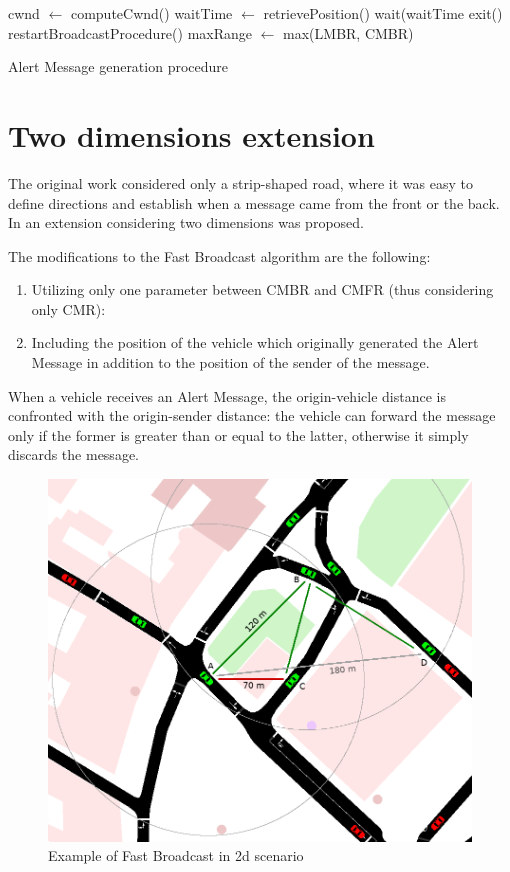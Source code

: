 		\begin{algorithm}[H]
			\begin{algorithmic}[1]
				\State cwnd $\gets$ computeCwnd()
				\State waitTime $\gets$ retrievePosition()
				\State wait(waitTime
				\State exit()
				\State restartBroadcastProcedure()
				\Else 
				\State maxRange $\gets$ max(LMBR, CMBR)
				\EndIf 
			\end{algorithmic}
			\caption{Alert Message generation procedure}
			\label{alg:alert-message-forwarding}
		\end{algorithm}
	
	\section{Two dimensions extension}
		The original work \cite{4199282} considered only a strip-shaped road, where it was easy to define directions and establish 	when a message came from the front or the back. In \cite{BAR2017} an extension considering two dimensions was proposed. 
		
		
		The modifications to the Fast Broadcast algorithm are the following:
		\begin{enumerate}
			\item Utilizing only one parameter between CMBR and CMFR (thus considering only CMR):
			\item Including the position of the vehicle which originally generated the Alert Message in addition to the position of the sender of the message.
		\end{enumerate}
		
		
		When a vehicle receives an Alert Message, the origin-vehicle distance is confronted with the origin-sender distance: the vehicle can forward the message only if the former is greater than or equal to the latter, otherwise it simply discards the message.
		
		\begin{figure}[H]
			\centering
			\includegraphics[width=\textwidth]{immagini/fb-2dpicc}
			\caption{Example of Fast Broadcast in 2d scenario}
			\label{fig:fb-2d}
		\end{figure}
		
